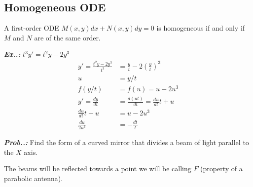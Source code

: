 \documentclass[a4paper]{article}
\begin{document}
\subsection{Homogeneous ODE}

\vspace{1ex}\vspace{1ex}

A first-order ODE $M(x,y)dx+N(x,y)dy=0$ is homogeneous if and only if $M$ and $N$ are of the same order.

\vspace{1ex}\vspace{1ex}

\vspace{2ex}\textit{\textbf{Ex.\thesection.\theex:}} $t^{3}y'=t^{2}y-2y^{3}$
\begin{align} 
y'=\frac{t^{2}y-2y^{3}}{t^{3}}&=\frac{y}{t}-2\left( \frac{y}{t} \right)^{3} \\
u&=y / t \\
f(y / t)&=f(u)=u-2u^{3} \\
y'=\frac{dy}{dt}&=\frac{d(ut)}{dt}=\frac{du}{dt}t+u \\
\frac{du}{dt}t+u&=u-2u^{3} \\
\frac{du}{2u^{3}}&=-\frac{dt}{t}
\end{align}

\vspace{2ex}\textit{\textbf{Prob.\thesection.\theprob:}} Find the form of a curved mirror that divides a beam of light parallel to the $X$ axis.

The beams will be reflected towards a point we will be calling $F$ (property of a parabolic antenna).
\end{document}
